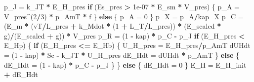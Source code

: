 \documentclass[]{article}
\newenvironment{Shaded}{\begin{snugshade}}{\end{snugshade}}
\newcommand{\DecValTok}[1]{\textcolor[rgb]{0.00,0.00,0.81}{#1}}
\newcommand{\FloatTok}[1]{\textcolor[rgb]{0.00,0.00,0.81}{#1}}
\newcommand{\StringTok}[1]{\textcolor[rgb]{0.31,0.60,0.02}{#1}}
\newcommand{\ControlFlowTok}[1]{\textcolor[rgb]{0.13,0.29,0.53}{\textbf{#1}}}
\newcommand{\OperatorTok}[1]{\textcolor[rgb]{0.81,0.36,0.00}{\textbf{#1}}}
\newcommand{\NormalTok}[1]{#1}
\begin{document}
\begin{Shaded}
\begin{Highlighting}[]
{{{\NormalTok{    p_J =}\StringTok{ }\NormalTok{k_JT }\OperatorTok{*}\StringTok{ }\NormalTok{E_H_pres}
    \ControlFlowTok{if}\NormalTok{ (Es_pres }\OperatorTok{>}\StringTok{ }\FloatTok{1e-07} \OperatorTok{*}\StringTok{ }\NormalTok{E_sm }\OperatorTok{*}\StringTok{ }\NormalTok{V_pres) \{}
\NormalTok{        p_A =}\StringTok{ }\NormalTok{V_pres}\OperatorTok{^}\NormalTok{(}\DecValTok{2}\OperatorTok{/}\DecValTok{3}\NormalTok{) }\OperatorTok{*}\StringTok{ }\NormalTok{p_AmT }\OperatorTok{*}\StringTok{ }\NormalTok{f}
\NormalTok{    \}}
    \ControlFlowTok{else}\NormalTok{ \{}
\NormalTok{        p_A =}\StringTok{ }\DecValTok{0}
\NormalTok{    \}}
\NormalTok{    p_X =}\StringTok{ }\NormalTok{p_A}\OperatorTok{/}\NormalTok{kap_X}
\NormalTok{    p_C =}\StringTok{ }\NormalTok{(E_m }\OperatorTok{*}\StringTok{ }\NormalTok{(vT}\OperatorTok{/}\NormalTok{L_pres }\OperatorTok{+}\StringTok{ }\NormalTok{k_Mdot }\OperatorTok{*}\StringTok{ }\NormalTok{(}\DecValTok{1} \OperatorTok{+}\StringTok{ }\NormalTok{L_T}\OperatorTok{/}\NormalTok{L_pres)) }\OperatorTok{*}\StringTok{ }\NormalTok{(E_scaled }\OperatorTok{*}\StringTok{ }
\StringTok{        }\NormalTok{g)}\OperatorTok{/}\NormalTok{(E_scaled }\OperatorTok{+}\StringTok{ }\NormalTok{g)) }\OperatorTok{*}\StringTok{ }\NormalTok{V_pres}
\NormalTok{    p_R =}\StringTok{ }\NormalTok{(}\DecValTok{1} \OperatorTok{-}\StringTok{ }\NormalTok{kap) }\OperatorTok{*}\StringTok{ }\NormalTok{p_C }\OperatorTok{-}\StringTok{ }\NormalTok{p_J}
    \ControlFlowTok{if}\NormalTok{ (E_H_pres }\OperatorTok{<}\StringTok{ }\NormalTok{E_Hp) \{}
        \ControlFlowTok{if}\NormalTok{ (E_H_pres }\OperatorTok{<=}\StringTok{ }\NormalTok{E_Hb) \{}
\NormalTok{            U_H_pres =}\StringTok{ }\NormalTok{E_H_pres}\OperatorTok{/}\NormalTok{p_AmT}
\NormalTok{            dUHdt =}\StringTok{ }\NormalTok{(}\DecValTok{1} \OperatorTok{-}\StringTok{ }\NormalTok{kap) }\OperatorTok{*}\StringTok{ }\NormalTok{Sc }\OperatorTok{-}\StringTok{ }\NormalTok{k_JT }\OperatorTok{*}\StringTok{ }\NormalTok{U_H_pres}
\NormalTok{            dE_Hdt =}\StringTok{ }\NormalTok{dUHdt }\OperatorTok{*}\StringTok{ }\NormalTok{p_AmT}
\NormalTok{        \}}
        \ControlFlowTok{else}\NormalTok{ \{}
\NormalTok{            dE_Hdt =}\StringTok{ }\NormalTok{(}\DecValTok{1} \OperatorTok{-}\StringTok{ }\NormalTok{kap) }\OperatorTok{*}\StringTok{ }\NormalTok{p_C }\OperatorTok{-}\StringTok{ }\NormalTok{p_J}
\NormalTok{        \}}
\NormalTok{    \}}
    \ControlFlowTok{else}\NormalTok{ \{}
\NormalTok{        dE_Hdt =}\StringTok{ }\DecValTok{0}
\NormalTok{    \}}
\NormalTok{    E_H =}\StringTok{ }\NormalTok{E_H_init }\OperatorTok{+}\StringTok{ }\NormalTok{dE_Hdt}
}}}
\end{Highlighting}
\end{Shaded}
\end{document}
